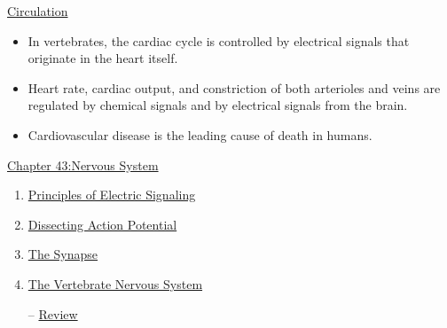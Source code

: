 \documentclass[12pt,letterpaper]{article}
\newcommand{\thetitle}{\hypertarget{home}{Animals and Ecology}}
\begin{document}
\begin{secbox}{\hyperlink{42}{Circulation}}
{\begin{itemize}
        \item In vertebrates, the cardiac cycle is controlled by electrical signals that originate in the heart itself. 
        \item Heart rate, cardiac output, and constriction of both arterioles and veins are regulated by chemical signals and by electrical signals from the brain. 
        \item Cardiovascular disease is the leading cause of death in humans.
    \end{itemize}
}\end{secbox}


\clearpage

\renewcommand{\thetitle}{\hypertarget{43}{Nervous System}}
\hypertarget{43}{}
\setcounter{section}{43}

\begin{chapbox}{\hyperlink{home}{Chapter 43:Nervous System}}
    \begin{enumerate}
        \item \hyperlink{43.1}{Principles of Electric Signaling}
        \item \hyperlink{43.2}{Dissecting Action Potential}
        \item \hyperlink{43.3}{The Synapse}
        \item \hyperlink{43.4}{The Vertebrate Nervous System}
        \item [--] \hyperlink{43.r}{Review}
    \end{enumerate}
\end{chapbox}
\end{document}
